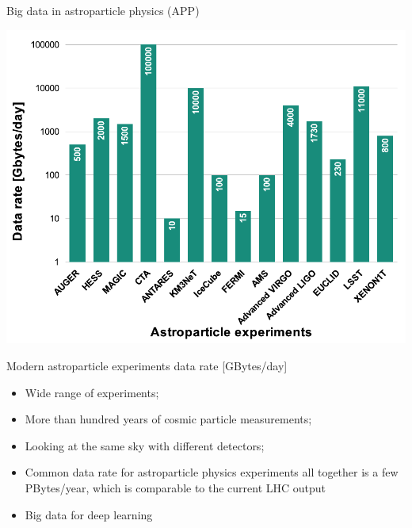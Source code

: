 \begin{frame}{Big data in astroparticle physics (APP)}
    \small
    \begin{minipage}[c]{0.58\textwidth}
        \begin{center}
            \includegraphics[width=1\textwidth]{pics/appec_computing-diagram.pdf}
        \end{center}
        \vspace{-2\parsep}
        \small Modern astroparticle experiments data rate [GBytes/day]\footnotemark[1] %
    \end{minipage}
    \hfill
    \begin{minipage}[c]{0.41\textwidth}
        \begin{itemize}
            \setlength{\itemsep}{0pt}
            \item Wide range of experiments;
            \item More than hundred years of cosmic particle measurements;
            \item Looking at the same sky with different detectors;
            \item Common data rate for astroparticle physics experiments all together is a few PBytes/year, which is comparable to the current LHC output\footnotemark[1]
            \item Big data for deep learning
        \end{itemize}
    \end{minipage}
    \footnotesize{}
\end{frame}
